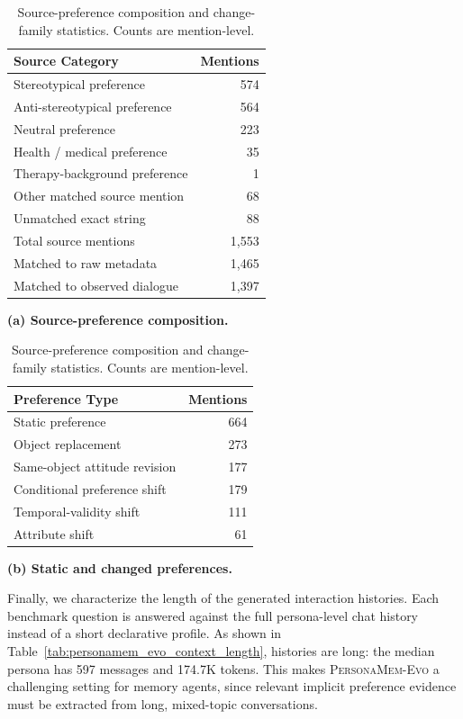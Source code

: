 \documentclass{article}
\begin{document}
\begin{table}[!htbp]
\centering
\small
\begin{minipage}[t]{0.48\linewidth}
\centering
\begin{tabular}{lr}
\toprule
\textbf{Source Category} & \textbf{Mentions} \\
\midrule
Stereotypical preference & 574 \\
Anti-stereotypical preference & 564 \\
Neutral preference & 223 \\
Health / medical preference & 35 \\
Therapy-background preference & 1 \\
Other matched source mention & 68 \\
Unmatched exact string & 88 \\
\midrule
Total source mentions & 1,553 \\
Matched to raw metadata & 1,465 \\
Matched to observed dialogue & 1,397 \\
\bottomrule
\end{tabular}
\vspace{1mm}

\textbf{(a) Source-preference composition.}
\end{minipage}
\hfill
\begin{minipage}[t]{0.42\linewidth}
\centering
\begin{tabular}{lr}
\toprule
\textbf{Preference Type} & \textbf{Mentions} \\
\midrule
Static preference & 664 \\
\midrule
Object replacement & 273 \\
Same-object attitude revision & 177 \\
Conditional preference shift & 179 \\
Temporal-validity shift & 111 \\
Attribute shift & 61 \\
\bottomrule
\end{tabular}
\vspace{1mm}

\textbf{(b) Static and changed preferences.}
\end{minipage}
\caption{Source-preference composition and change-family statistics. Counts are mention-level.}
\label{tab:personamem_evo_source_composition}
\end{table}

Finally, we characterize the length of the generated interaction histories. Each benchmark question is answered against the full persona-level chat history instead of a short declarative profile. As shown in Table~\ref{tab:personamem_evo_context_length}, histories are long: the median persona has 597 messages and 174.7K tokens. This makes \textsc{PersonaMem-Evo} a challenging setting for memory agents, since relevant implicit preference evidence must be extracted from long, mixed-topic conversations.
\end{document}
